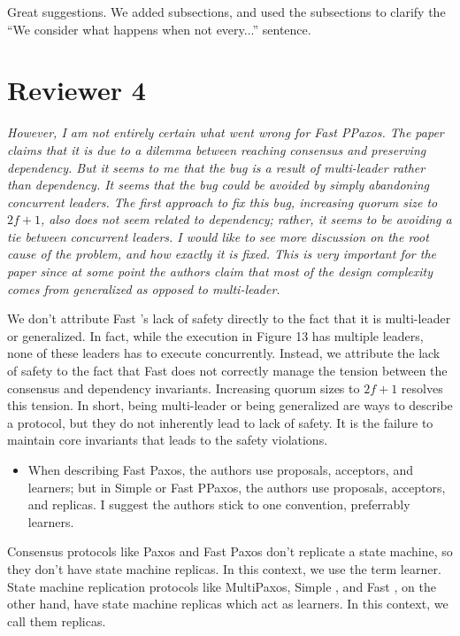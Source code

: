 \documentclass[letterpaper,twocolumn,10pt]{article}
\newenvironment{reviewerquote}
{\list{}{\leftmargin=\parindent\rightmargin=0in}\item[] \itshape \color{ReviewerDarkGray}}%
{\endlist}
\begin{document}
Great suggestions. We added subsections, and used the subsections to clarify
the ``We consider what happens when not every...'' sentence.

\section*{Reviewer 4}
\begin{reviewerquote}
  However, I am not entirely certain what went wrong for Fast PPaxos. The paper
  claims that it is due to a dilemma between reaching consensus and preserving
  dependency. But it seems to me that the bug is a result of multi-leader
  rather than dependency. It seems that the bug could be avoided by simply
  abandoning concurrent leaders. The first approach to fix this bug, increasing
  quorum size to $2f+1$, also does not seem related to dependency; rather, it
  seems to be avoiding a tie between concurrent leaders. I would like to see
  more discussion on the root cause of the problem, and how exactly it is
  fixed. This is very important for the paper since at some point the authors
  claim that most of the design complexity comes from generalized as opposed to
  multi-leader.
\end{reviewerquote}

We don't attribute Fast \BPaxos{}'s lack of safety directly to the fact that it
is multi-leader or generalized. In fact, while the execution in Figure 13 has
multiple leaders, none of these leaders has to execute concurrently. Instead,
we attribute the lack of safety to the fact that Fast \BPaxos{} does not
correctly manage the tension between the consensus and dependency invariants.
Increasing quorum sizes to $2f+1$ resolves this tension. In short, being
multi-leader or being generalized are ways to describe a protocol, but they do
not inherently lead to lack of safety. It is the failure to maintain core
invariants that leads to the safety violations.

\begin{reviewerquote}
  \begin{itemize}
    \item
      When describing Fast Paxos, the authors use proposals, acceptors, and
      learners; but in Simple or Fast PPaxos, the authors use proposals,
      acceptors, and replicas. I suggest the authors stick to one convention,
      preferrably learners.
  \end{itemize}
\end{reviewerquote}

Consensus protocols like Paxos and Fast Paxos don't replicate a state machine,
so they don't have state machine replicas. In this context, we use the term
learner. State machine replication protocols like MultiPaxos, Simple \BPaxos{},
and Fast \BPaxos{}, on the other hand, have state machine replicas which act as
learners. In this context, we call them replicas.
\end{document}

